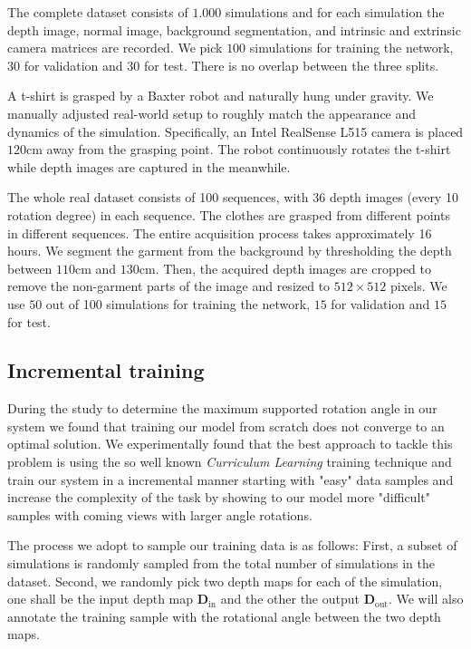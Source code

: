 The complete dataset consists of $1.000$ simulations and for each simulation  the depth image, normal image, background segmentation, and intrinsic and extrinsic camera matrices are recorded. We pick $100$  simulations for training the network, $30$ for validation and $30$ for test. There is no overlap between the three splits.

\vspace{1mm}
 A t-shirt is grasped by a Baxter robot and naturally hung under gravity. 
We manually adjusted real-world setup to roughly match the appearance and dynamics of the simulation. Specifically, an Intel RealSense L515 camera is placed $120$cm away from the grasping point. The robot continuously rotates the t-shirt while depth images are captured in the meanwhile.

The whole real dataset consists of 100 sequences, with 36 depth images (every 10 rotation degree) in each sequence. 
The clothes are grasped from different points in different sequences. The entire acquisition process takes approximately 16 hours. We segment the garment from the background by thresholding the depth between $110$cm and $130$cm. Then, the acquired depth images are cropped to remove the non-garment parts of the image and resized to $512\times512$ pixels.
We use $50$  out of 100 simulations for training the network, $15$ for validation and $15$ for test.


\subsection{Incremental training}

During the study to determine the maximum supported rotation angle in our system we found that training our model from scratch does not converge to an optimal solution. We experimentally found that the best approach to tackle this problem is using the so well known \textit{Curriculum Learning} training technique and train our system in a incremental manner starting with "easy" data samples and increase the complexity of the task by showing to our model more "difficult" samples with coming views with larger angle rotations.

The process we adopt to sample our training data is as follows: First, a subset of simulations is randomly sampled from the total number of  simulations in the dataset. Second, we randomly pick two depth maps for each of the simulation, one shall be the input depth map $\mathbf{D}_{\textrm{in}}$ and the other the output $\mathbf{D}_{\textrm{out}}$. We will also annotate the training sample with  the rotational angle between the two depth maps.

